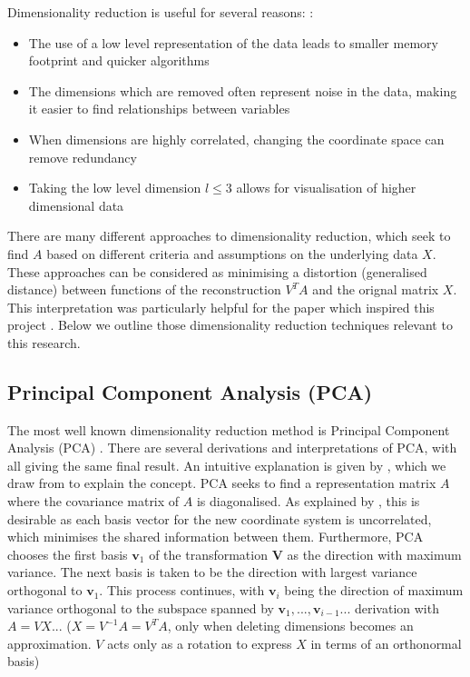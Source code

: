Dimensionality reduction is useful for several reasons: \citep{Shlens2005}: 

\begin{itemize}
    \item The use of a low level representation of the data leads to smaller memory footprint and quicker algorithms 
    \item The dimensions which are removed often represent noise in the data, making it easier to find relationships between variables
    \item When dimensions are highly correlated, changing the coordinate space can remove redundancy
    \item Taking the low level dimension $l \leq 3$ allows for visualisation of higher dimensional data
\end{itemize}

There are many different approaches to dimensionality reduction, which seek to find $A$ based on different criteria and assumptions on the underlying data $X$. These approaches can be considered as minimising a distortion (generalised distance)  between functions of the reconstruction $V^TA$ and the orignal matrix $X$. This interpretation was particularly helpful for the paper which inspired this project \citep{Avalos2018}. Below we outline those dimensionality reduction techniques relevant to this research.    

\subsection{Principal Component Analysis (PCA)}
The most well known dimensionality reduction method is Principal Component Analysis (PCA) \citep{MackiewiczRatajczak1993}. There are several derivations and interpretations of PCA, with all giving the same final result. An intuitive explanation is given by \cite{Shlens2005}, which we draw from to explain the concept. PCA seeks to find a representation matrix $A$ where the covariance matrix of $A$ is diagonalised. As explained by \cite{Shlens2005}, this is desirable as each basis vector for the new coordinate system is uncorrelated, which minimises the shared information between them. Furthermore, PCA chooses the first basis $\mathbf{v}_1$ of the transformation $\mathbf{V}$ as the direction with maximum variance. The next basis is taken to be the direction with largest variance orthogonal to $\mathbf{v}_1$. This process continues, with $\mathbf{v}_i$ being the direction of maximum variance orthogonal to the subspace spanned by $\mathbf{v}_1, ...,\mathbf{v}_{i-1}$... derivation with $A = VX$... ($X = V^{-1}A = V^TA$, only when deleting dimensions becomes an approximation. $V$ acts only as a rotation to express $X$ in terms of an orthonormal basis) 


